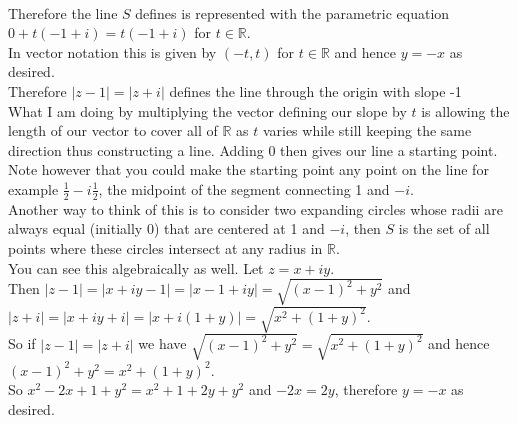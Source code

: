 \documentclass{article}
\begin{document}
\begin{center}
    \\Therefore the line $S$ defines is represented with the parametric equation $0 + t(-1 + i) = t(-1 + i)$ for $t\in\mathbb{R}$.
    \\In vector notation this is given by $(-t, t)$ for $t\in\mathbb{R}$ and hence $y = -x$ as desired.
    \\Therefore $|z - 1| = |z + i|$ defines the line through the origin with slope -1 \qedsymbol
    \break
    \\What I am doing by multiplying the vector defining our slope by $t$ is allowing the length of our vector to cover all of $\mathbb{R}$ as $t$ varies while still keeping the same direction thus constructing a line. Adding 0 then gives our line a starting point. Note however that you could make the starting point any point on the line for example $\frac{1}{2} - i\frac{1}{2}$, the midpoint of the segment connecting 1 and $-i$.
    \\Another way to think of this is to consider two expanding circles whose radii are always equal (initially 0) that are centered at 1 and $-i$, then $S$ is the set of all points where these circles intersect at any radius in $\mathbb{R}$.
    \break
    \\You can see this algebraically as well. Let $z = x + iy$.
    \\Then $|z - 1| = |x + iy - 1| = |x - 1 + iy| =\sqrt{(x - 1)^2 + y^2}$ and $|z + i| = |x + iy + i| = |x + i(1 + y)| =\sqrt{x^2 + (1 + y)^2}$.
    \\So if $|z - 1| = |z + i|$ we have $\sqrt{(x - 1)^2 + y^2} =\sqrt{x^2 + (1 + y)^2}$ and hence $(x - 1)^2 + y^2 =x^2 + (1 + y)^2$.
    \\So $x^2 -2x + 1 + y^2 = x^2 + 1 + 2y + y^2$ and $-2x = 2y$, therefore $y = -x$ as desired.
\end{center}


\newpage
\end{document}
